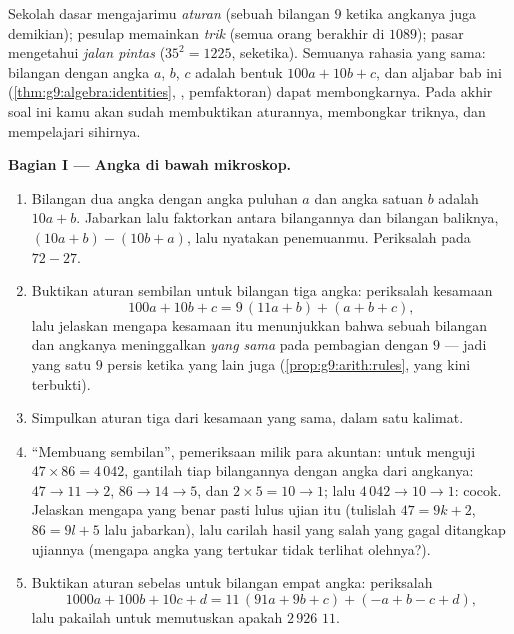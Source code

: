 \begin{problem}
\label{pb:g9:algebra:1}
Sekolah dasar mengajarimu \emph{aturan} (sebuah bilangan 
$9$ ketika  angkanya juga demikian); pesulap memainkan
\emph{trik} (semua orang berakhir di $1089$); pasar mengetahui
\emph{jalan pintas} ($35^2 = 1225$, seketika). Semuanya rahasia yang
sama: bilangan dengan angka $a$, $b$, $c$ adalah bentuk
$100a + 10b + c$, dan aljabar bab ini
(\cref{thm:g9:algebra:identities}, , pemfaktoran) dapat
membongkarnya. Pada akhir soal ini kamu akan sudah membuktikan
aturannya, membongkar triknya, dan mempelajari sihirnya.

\medskip
\noindent\textbf{Bagian I --- Angka di bawah mikroskop.}
\begin{enumerate}
  \item Bilangan dua angka dengan angka puluhan $a$ dan angka satuan
        $b$ adalah $10a + b$. Jabarkan lalu faktorkan 
        antara bilangannya dan bilangan baliknya,
        $(10a + b) - (10b + a)$, lalu nyatakan penemuanmu.
        Periksalah pada $72 - 27$.
  \item Buktikan aturan sembilan untuk bilangan tiga angka:
        periksalah kesamaan
        \[
        100a + 10b + c = 9\,(11a + b) + (a + b + c),
        \]
        lalu jelaskan mengapa kesamaan itu menunjukkan bahwa sebuah
        bilangan dan  angkanya meninggalkan \emph{ yang
        sama} pada pembagian dengan $9$
        --- jadi yang satu  $9$ persis ketika yang lain
        juga (\cref{prop:g9:arith:rules}, yang kini terbukti).
  \item Simpulkan aturan tiga dari kesamaan yang sama, dalam satu
        kalimat.
  \item ``Membuang sembilan'', pemeriksaan milik para akuntan: untuk
        menguji $47 \times 86 = 4\,042$, gantilah tiap bilangannya
        dengan  angka dari  angkanya: $47 \to 11 \to 2$,
        $86 \to 14 \to 5$, dan $2 \times 5 = 10 \to 1$; lalu
        $4\,042 \to 10 \to 1$: cocok. Jelaskan mengapa 
        yang benar pasti lulus ujian itu (tulislah $47 = 9k + 2$,
        $86 = 9l + 5$ lalu jabarkan), lalu carilah hasil yang salah
        yang gagal ditangkap ujiannya (mengapa angka yang tertukar
        tidak terlihat olehnya?).
  \item Buktikan aturan sebelas untuk bilangan empat angka:
        periksalah
        \[
        1000a + 100b + 10c + d
        = 11\,(91a + 9b + c) + (- a + b - c + d),
        \]
        lalu pakailah untuk memutuskan apakah $2\,926$ 
        $11$.
\end{enumerate}


\end{problem}
